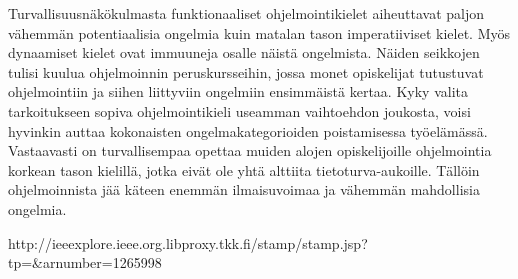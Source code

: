 Turvallisuusnäkökulmasta funktionaaliset ohjelmointikielet aiheuttavat paljon
vähemmän potentiaalisia ongelmia kuin matalan tason imperatiiviset kielet.
Myös dynaamiset kielet ovat immuuneja osalle näistä ongelmista. Näiden
seikkojen tulisi kuulua ohjelmoinnin peruskursseihin, jossa monet opiskelijat
tutustuvat ohjelmointiin ja siihen liittyviin ongelmiin ensimmäistä kertaa.
Kyky valita tarkoitukseen sopiva ohjelmointikieli useamman vaihtoehdon joukosta,
voisi hyvinkin auttaa kokonaisten ongelmakategorioiden poistamisessa
työelämässä. Vastaavasti on turvallisempaa opettaa muiden alojen opiskelijoille
ohjelmointia korkean tason kielillä, jotka eivät ole yhtä alttiita
tietoturva-aukoille. Tällöin ohjelmoinnista jää käteen enemmän ilmaisuvoimaa ja
vähemmän mahdollisia ongelmia.

http://ieeexplore.ieee.org.libproxy.tkk.fi/stamp/stamp.jsp?tp=\&arnumber=1265998

%
\pagebreak
